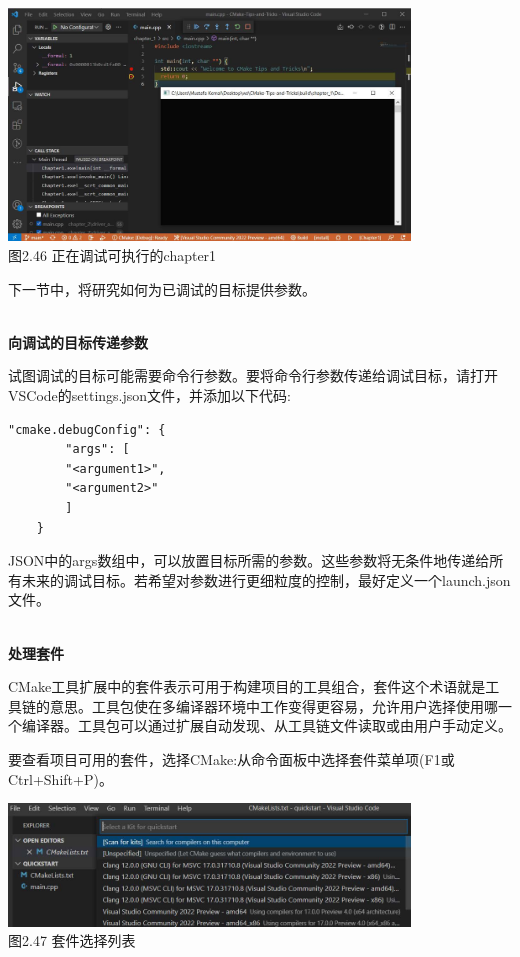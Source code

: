 \begin{center}
\includegraphics[width=0.8\textwidth]{content/1/chapter2/images/46.jpg}\\
图2.46 正在调试可执行的chapter1
\end{center}

下一节中，将研究如何为已调试的目标提供参数。

\hspace*{\fill} \\ %
\noindent
\textbf{向调试的目标传递参数}

试图调试的目标可能需要命令行参数。要将命令行参数传递给调试目标，请打开VSCode的settings.json文件，并添加以下代码:

\begin{lstlisting}[style=styleCMake]
"cmake.debugConfig": {
		"args": [
		"<argument1>",
		"<argument2>"
		]
	}
\end{lstlisting}

JSON中的args数组中，可以放置目标所需的参数。这些参数将无条件地传递给所有未来的调试目标。若希望对参数进行更细粒度的控制，最好定义一个launch.json文件。

\hspace*{\fill} \\ %
\noindent
\textbf{处理套件}

CMake工具扩展中的套件表示可用于构建项目的工具组合，套件这个术语就是工具链的意思。工具包使在多编译器环境中工作变得更容易，允许用户选择使用哪一个编译器。工具包可以通过扩展自动发现、从工具链文件读取或由用户手动定义。

要查看项目可用的套件，选择CMake:从命令面板中选择套件菜单项(F1或Ctrl+Shift+P)。

\begin{center}
\includegraphics[width=0.8\textwidth]{content/1/chapter2/images/47.jpg}\\
图2.47 套件选择列表
\end{center}

